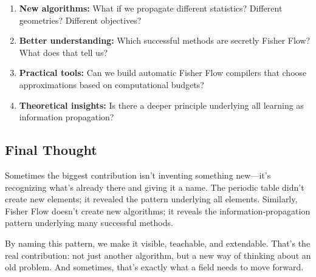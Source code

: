 \documentclass[11pt]{article}
\begin{document}
\begin{enumerate}
\item \textbf{New algorithms:} What if we propagate different statistics? Different geometries? Different objectives?
\item \textbf{Better understanding:} Which successful methods are secretly Fisher Flow? What does that tell us?
\item \textbf{Practical tools:} Can we build automatic Fisher Flow compilers that choose approximations based on computational budgets?
\item \textbf{Theoretical insights:} Is there a deeper principle underlying all learning as information propagation?
\end{enumerate}

\subsection{Final Thought}

Sometimes the biggest contribution isn't inventing something new—it's recognizing what's already there and giving it a name. The periodic table didn't create new elements; it revealed the pattern underlying all elements. Similarly, Fisher Flow doesn't create new algorithms; it reveals the information-propagation pattern underlying many successful methods.

By naming this pattern, we make it visible, teachable, and extendable. That's the real contribution: not just another algorithm, but a new way of thinking about an old problem. And sometimes, that's exactly what a field needs to move forward.


\end{document}

